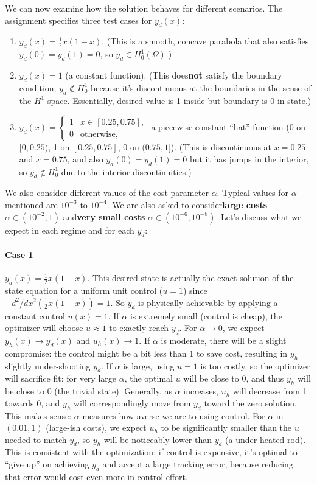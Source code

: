 \documentclass[a4paper,10pt]{report}
\begin{document}
We can now examine how the solution behaves for different scenarios. The assignment specifies three test cases for \(y_d(x)\):
\begin{enumerate}
	\item \(y_d(x) = \frac{1}{2}x(1-x)\). (This is a smooth, concave parabola that also satisfies \(y_d(0)=y_d(1)=0\), so \(y_d \in H^1_0(\Omega)\).)
	\item \(y_d(x) = 1\) (a constant function). (This does\textbf{not} satisfy the boundary condition; \(y_d \notin H^1_0\) because it's discontinuous at the boundaries in the sense of the \(H^1\) space. Essentially, desired value is 1 inside but boundary is 0 in state.)
	\item \(y_d(x) = \begin{cases}1 & x\in[0.25,0.75], \\ 0 & \text{otherwise},\end{cases}\) a piecewise constant “hat” function (0 on \([0,0.25)\), 1 on \([0.25,0.75]\), 0 on \((0.75,1]\)). (This is discontinuous at \(x=0.25\) and \(x=0.75\), and also \(y_d(0)=y_d(1)=0\) but it has jumps in the interior, so \(y_d \notin H^1_0\) due to the interior discontinuities.)
\end{enumerate}
We also consider different values of the cost parameter \(\alpha\). Typical values for \(\alpha\) mentioned are \(10^{-3}\) to \(10^{-4}\). We are also asked to consider\textbf{large costs} \(\alpha \in (10^{-2}, 1)\) and\textbf{very small costs} \(\alpha \in (10^{-6}, 10^{-8})\).
Let's discuss what we expect in each regime and for each \(y_d\):

\paragraph{Case 1}
\(y_d(x)=\frac{1}{2}x(1-x)\).
This desired state is actually the exact solution of the state equation for a uniform unit control (\(u=1\)) since \(-d^2/dx^2(\frac{1}{2}x(1-x)) = 1\). So \(y_d\) is physically achievable by applying a constant control \(u(x)=1\). If \(\alpha\) is extremely small (control is cheap), the optimizer will choose \(u \approx 1\) to exactly reach \(y_d\). For \(\alpha \to 0\), we expect \(y_h(x) \to y_d(x)\) and \(u_h(x) \to 1\). If \(\alpha\) is moderate, there will be a slight compromise: the control might be a bit less than 1 to save cost, resulting in \(y_h\) slightly under-shooting \(y_d\). If \(\alpha\) is large, using \(u=1\) is too costly, so the optimizer will sacrifice fit: for very large \(\alpha\), the optimal \(u\) will be close to 0, and thus \(y_h\) will be close to 0 (the trivial state). Generally, as \(\alpha\) increases, \(u_h\) will decrease from 1 towards 0, and \(y_h\) will correspondingly move from \(y_d\) toward the zero solution. This makes sense: \(\alpha\) measures how averse we are to using control. For \(\alpha\) in \((0.01,1)\) (large-ish costs), we expect \(u_h\) to be significantly smaller than the \(u\) needed to match \(y_d\), so \(y_h\) will be noticeably lower than \(y_d\) (a under-heated rod). This is consistent with the optimization: if control is expensive, it's optimal to “give up” on achieving \(y_d\) and accept a large tracking error, because reducing that error would cost even more in control effort.
\end{document}
